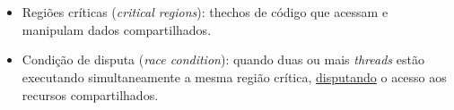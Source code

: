 


\frame{\title{\insertlecture}\titlepage}



\section{\insertlecture}
\begin{frame}{\insertlecture}

  \begin{itemize}
  \item \alert{Regiões críticas} ({\em critical regions}): thechos de
    código que acessam e manipulam dados compartilhados.
  \item \alert{Condição de disputa} ({\em race condition}): quando
    duas ou mais {\em threads} estão executando simultaneamente a
    mesma região crítica, \underline{disputando} o acesso aos recursos
    compartilhados.
  \end{itemize}

\end{frame}


